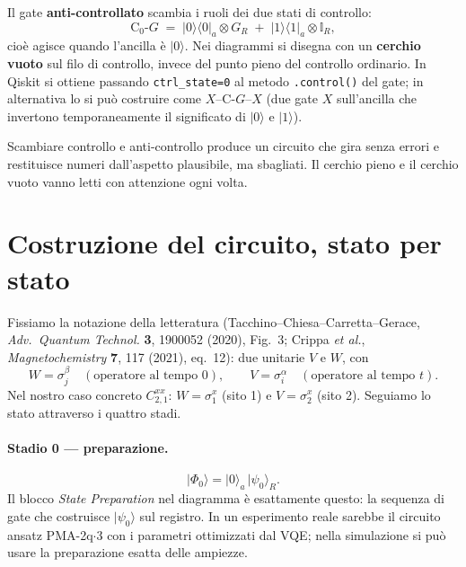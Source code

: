 \documentclass[11pt,a4paper]{article}
\begin{document}
Il gate \textbf{anti-controllato} scambia i ruoli dei due stati di controllo:
\begin{equation}
\mathrm{C}_0\text{-}G \;=\; |0\rangle\langle0|_a\otimes G_R \;+\; |1\rangle\langle1|_a\otimes\mathbb{I}_R ,
\label{eq:antictrl}
\end{equation}
cioè agisce quando l'ancilla è $|0\rangle$. Nei diagrammi si disegna con un \textbf{cerchio
vuoto} sul filo di controllo, invece del punto pieno del controllo ordinario. In Qiskit si
ottiene passando \texttt{ctrl\_state=0} al metodo \texttt{.control()} del gate; in alternativa
lo si può costruire come
$X$--$\mathrm{C}\text{-}G$--$X$ (due gate $X$ sull'ancilla che invertono temporaneamente il
significato di $|0\rangle$ e $|1\rangle$).

\begin{warnbox}
Scambiare controllo e anti-controllo produce un circuito che gira senza errori e restituisce
numeri dall'aspetto plausibile, ma sbagliati. Il cerchio pieno e il cerchio vuoto vanno letti
con attenzione ogni volta.
\end{warnbox}

\section{Costruzione del circuito, stato per stato}

Fissiamo la notazione della letteratura (Tacchino--Chiesa--Carretta--Gerace,
\textit{Adv.\ Quantum Technol.} \textbf{3}, 1900052 (2020), Fig.~3; Crippa \textit{et al.},
\textit{Magnetochemistry} \textbf{7}, 117 (2021), eq.~12): due unitarie $V$ e $W$, con
\begin{equation}
W=\sigma_j^\beta \quad(\text{operatore al tempo }0),
\qquad
V=\sigma_i^\alpha \quad(\text{operatore al tempo }t).
\end{equation}
Nel nostro caso concreto $C_{2,1}^{xx}$: $W=\sigma_1^x$ (sito 1) e $V=\sigma_2^x$ (sito 2).
Seguiamo lo stato attraverso i quattro stadi.

\paragraph{Stadio 0 --- preparazione.}
\begin{equation}
|\Phi_0\rangle=|0\rangle_a\,|\psi_0\rangle_R .
\end{equation}
Il blocco \emph{State Preparation} nel diagramma è esattamente questo: la sequenza di gate che
costruisce $|\psi_0\rangle$ sul registro. In un esperimento reale sarebbe il circuito ansatz
PMA-2q$\cdot$3 con i parametri ottimizzati dal VQE; nella simulazione si può usare la
preparazione esatta delle ampiezze.
\end{document}
